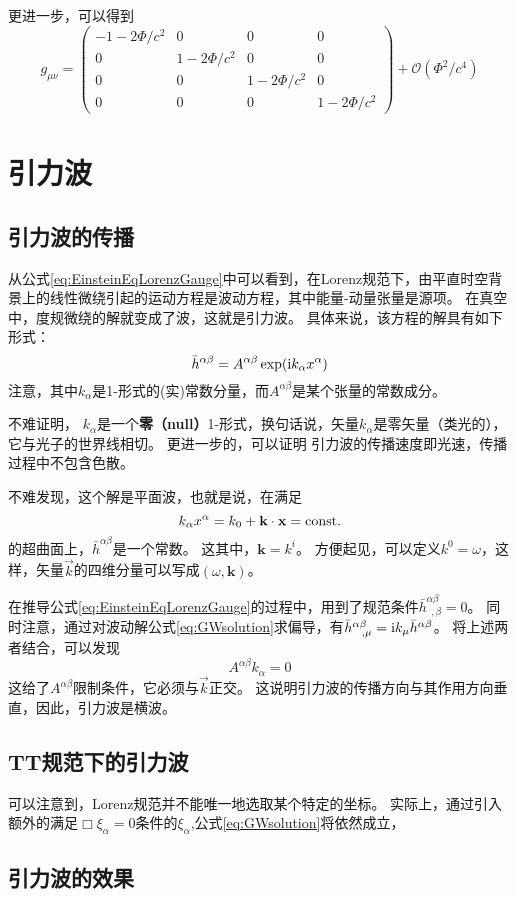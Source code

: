 更进一步，可以得到
\begin{equation}\label{eq:NewtonianMetric}
  g_{\mu\nu} ={\begin{pmatrix}
    -1-2\Phi/c^2 & 0 & 0 & 0\\
    0 & 1-2\Phi/c^2 & 0 & 0\\ 
    0 & 0 & 1-2\Phi/c^2 & 0\\
    0 & 0 & 0 & 1-2\Phi/c^2\end{pmatrix}} + \mathcal{O}(\Phi^2/c^4)
\end{equation}


\section{引力波}
\subsection{引力波的传播}
从公式\ref{eq:EinsteinEqLorenzGauge}中可以看到，在Lorenz规范下，由平直时空背景上的线性微绕引起的运动方程是波动方程，其中能量-动量张量是源项。
在真空中，度规微绕的解就变成了波，这就是引力波。
具体来说，该方程的解具有如下形式：
\begin{equation}\label{eq:GWsolution} 
  \bar{h}^{\alpha\beta} =  A^{\alpha\beta} \exp({\rm i} k_\alpha x^\alpha)
\end{equation}
注意，其中${k_\alpha}$是1-形式的(实)常数分量，而$A^{\alpha\beta}$是某个张量的常数成分。

不难证明，%
$k_\alpha$是一个{\textbf{零（null）}}1-形式，换句话说，矢量$k_\alpha$是零矢量（类光的），它与光子的世界线相切。
更进一步的，可以证明%
引力波的传播速度即光速，传播过程中不包含色散。%

不难发现，这个解是平面波，也就是说，在满足
\begin{equation}\label{eq:PlaneWave} 
  k_\alpha x^\alpha = k_0+\textbf{k}\cdot\textbf{x} =  {\rm const.}
\end{equation}
的超曲面上，$\bar{h}^{\alpha\beta} $是一个常数。
这其中，$\textbf{k}={k^i}$。
方便起见，可以定义$k^0=\omega$，这样，矢量$\vec{k}$的四维分量可以写成$(\omega,\textbf{k})$。

在推导公式\ref{eq:EinsteinEqLorenzGauge}的过程中，用到了规范条件$\bar{h}^{\alpha\beta}_{~~,\beta} = 0$。
同时注意，通过对波动解公式\ref{eq:GWsolution}求偏导，有$\bar{h}^{\alpha\beta}_{~~ ,\mu} = {\rm i}k_\mu \bar{h}^{\alpha\beta}$。
将上述两者结合，可以发现
\begin{equation}\label{eq:Transverse} 
  A^{\alpha\beta} k_\alpha  = 0
\end{equation}
这给了$A^{\alpha\beta} $限制条件，它必须与$\vec{k}$正交。
这说明引力波的传播方向与其作用方向垂直，因此，引力波是横波。

\subsection{TT规范下的引力波}
可以注意到，Lorenz规范并不能唯一地选取某个特定的坐标。
实际上，通过引入额外的满足$\Box \xi_\alpha = 0$条件的$\xi_\alpha$,公式\ref{eq:GWsolution}将依然成立，

\subsection{引力波的效果}
